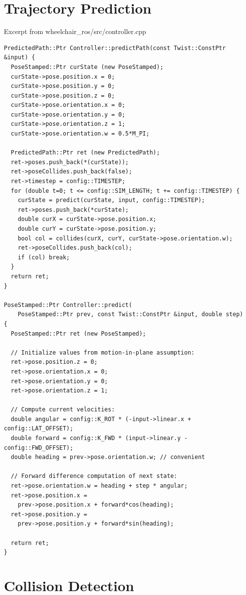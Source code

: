 \documentclass[oneside,final,a4paper]{report}
\begin{document}
\clearpage
\section{Trajectory Prediction}
\label{appendix:trajectory_prediction}
Excerpt from wheelchair\_ros/src/controller.cpp

\begin{lstlisting}
PredictedPath::Ptr Controller::predictPath(const Twist::ConstPtr &input) {
  PoseStamped::Ptr curState (new PoseStamped);
  curState->pose.position.x = 0;
  curState->pose.position.y = 0;
  curState->pose.position.z = 0;
  curState->pose.orientation.x = 0;
  curState->pose.orientation.y = 0;
  curState->pose.orientation.z = 1;
  curState->pose.orientation.w = 0.5*M_PI;

  PredictedPath::Ptr ret (new PredictedPath);
  ret->poses.push_back(*(curState));
  ret->poseCollides.push_back(false);
  ret->timestep = config::TIMESTEP;
  for (double t=0; t <= config::SIM_LENGTH; t += config::TIMESTEP) {
    curState = predict(curState, input, config::TIMESTEP);
    ret->poses.push_back(*curState);
    double curX = curState->pose.position.x;
    double curY = curState->pose.position.y;
    bool col = collides(curX, curY, curState->pose.orientation.w);
    ret->poseCollides.push_back(col);
    if (col) break;
  }
  return ret;
}

PoseStamped::Ptr Controller::predict(
    PoseStamped::Ptr prev, const Twist::ConstPtr &input, double step) 
{
  PoseStamped::Ptr ret (new PoseStamped);

  // Initialize values from motion-in-plane assumption:
  ret->pose.position.z = 0;
  ret->pose.orientation.x = 0;
  ret->pose.orientation.y = 0;
  ret->pose.orientation.z = 1;

  // Compute current velocities:
  double angular = config::K_ROT * (-input->linear.x + config::LAT_OFFSET);
  double forward = config::K_FWD * (input->linear.y - config::FWD_OFFSET); 
  double heading = prev->pose.orientation.w; // convenient

  // Forward difference computation of next state:
  ret->pose.orientation.w = heading + step * angular;
  ret->pose.position.x = 
    prev->pose.position.x + forward*cos(heading);
  ret->pose.position.y =
    prev->pose.position.y + forward*sin(heading);

  return ret;
}
\end{lstlisting}

\clearpage
\section{Collision Detection}
\label{appendix:collision_detection}
\end{document}
